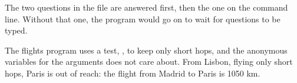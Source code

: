 
The two questions in the file are answered first, then the one on the
command line. Without that one, the program would go on to wait for
questions to be typed.



The flights program uses a test, , to keep only short hops,
and the anonymous variables \code{_} for the arguments  does
not care about. From Lisbon, flying only short hops, Paris is out of reach:
the flight from Madrid to Paris is 1050 km.



